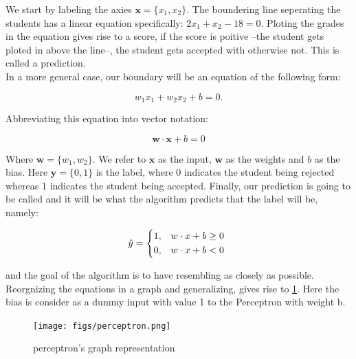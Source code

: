 We start by labeling the axies $\textbf{x} = \{x_{1}, x_{2}\}$.
The boundering line seperating the students has a linear equation
specifically: $2x_{1} + x_{2} - 18 = 0$.
Ploting the grades in the equation gives rise to a score, if the score is poitive --the student
gets ploted in above the line--, the student gets accepted with otherwise not. This is called a prediction.\\

In a more general case, our boundary will be an equation of the following form:

$$w_{1}x_{1} + w_{2}x_{2} + b = 0.$$

Abbreviating this equation into vector notation:

\begin{equation}
  \label{linear}
  \textbf{w}\cdot\textbf{x} + b = 0
\end{equation}

Where $\textbf{w} = \{w_{1}, w_{2}\}$. We refer to $\textbf{x}$ as the input, $\textbf{w}$ as the weights and $b$ as the bias. Here $\textbf{y} = \{0, 1\}$ is the label, where 0 indicates the student being rejected whereas 1 indicates the student being accepted. Finally, our prediction is going to be called \mbox{} and it will be what the algorithm predicts that the label will be, namely:

\begin{equation}
  \label{y_hat}
  \hat{y} =
  \begin{dcases*}
    \text{1,}  &$w\cdot x + b \geq 0$ \\
    \text{0,}  &$w\cdot x + b < 0$
  \end{dcases*}
\end{equation}

and the goal of the algorithm is to have \mbox{} resembling \mbox{} as closely as possible. Reorgnizing the equations in a graph and generalizing, gives rise to \cref{fig:neuron}. Here the bias is consider as a dummy input with value 1 to the Perceptron with weight b.

\begin{figure}[H]
  \centering
  \texttt{[image: figs/perceptron.png]}
  \caption{perceptron's graph representation}\label{fig:neuron}
\end{figure}

